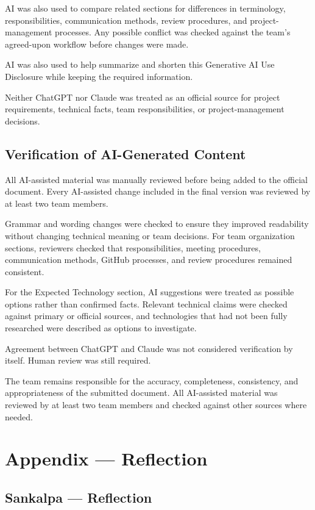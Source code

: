 \documentclass{article}
\begin{document}
AI was also used to compare related sections for differences in terminology, responsibilities,
communication methods, review procedures, and project-management processes. Any possible
conflict was checked against the team's agreed-upon workflow before changes were made.

AI was also used to help summarize and shorten this Generative AI Use Disclosure while
keeping the required information.

Neither ChatGPT nor Claude was treated as an official source for project requirements,
technical facts, team responsibilities, or project-management decisions.

\subsection{Verification of AI-Generated Content}
All AI-assisted material was manually reviewed before being added to the official document.
Every AI-assisted change included in the final version was reviewed by at least two team
members.

Grammar and wording changes were checked to ensure they improved readability without changing
technical meaning or team decisions. For team organization sections, reviewers checked that
responsibilities, meeting procedures, communication methods, GitHub processes, and review
procedures remained consistent.

For the Expected Technology section, AI suggestions were treated as possible options rather
than confirmed facts. Relevant technical claims were checked against primary or official
sources, and technologies that had not been fully researched were described as options to
investigate.

Agreement between ChatGPT and Claude was not considered verification by itself. Human review
was still required.

The team remains responsible for the accuracy, completeness, consistency, and appropriateness
of the submitted document. All AI-assisted material was reviewed by at least two team members
and checked against other sources where needed.

\newpage{}

\section*{Appendix --- Reflection}

\subsection*{Sankalpa --- Reflection}
\end{document}
